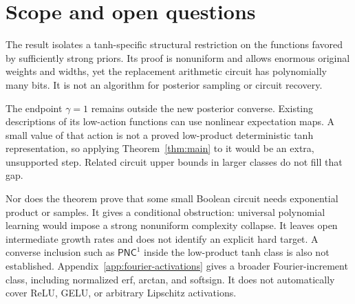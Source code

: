 \documentclass[11pt]{article}
\theoremstyle{remark}\newtheorem{remark}[theorem]{Remark}
\newcommand{\PNC}{\mathsf{PNC}}
\begin{document}


\section{Scope and open questions}

The result isolates a tanh-specific structural restriction on the
functions favored by sufficiently strong priors. Its proof is
nonuniform and allows enormous original weights and widths, yet the
replacement arithmetic circuit has polynomially many bits. It is not
an algorithm for posterior sampling or circuit recovery.

The endpoint $\gamma=1$ remains outside the new posterior converse.
Existing descriptions of its low-action functions can use nonlinear
expectation maps. A small value of that action is not a proved
low-product deterministic tanh representation, so applying
Theorem~\ref{thm:main} to it would be an extra, unsupported step.
Related circuit upper bounds in larger classes do not fill that gap.

Nor does the theorem prove that some small Boolean circuit needs
exponential product or samples. It gives a conditional obstruction:
universal polynomial learning would impose a strong nonuniform
complexity collapse. It leaves open intermediate growth rates and
does not identify an explicit hard target. A converse inclusion such
as $\PNC^1$ inside the low-product tanh class is also not established.
Appendix~\ref{app:fourier-activations} gives a broader Fourier-increment
class, including normalized erf, arctan, and softsign. It does not
automatically cover ReLU, GELU, or arbitrary Lipschitz activations.

\appendix



\end{document}
